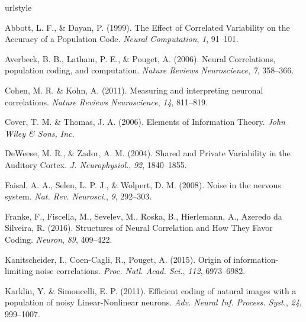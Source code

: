 \documentclass[12pt]{article}
\begin{document}
\newpage
\begin{thebibliography}{100}
\providecommand{\natexlab}[1]{#1}
\expandafter\ifx\csname urlstyle\endcsname\relax
  \providecommand{\doi}[1]{doi:\discretionary{}{}{}#1}\else
  \providecommand{\doi}{doi:\discretionary{}{}{}\begingroup
  \urlstyle{rm}\Url}\fi


Abbott, L. F., \& Dayan, P. (1999).
\newblock The Effect of Correlated Variability on the Accuracy of a Population Code.
\newblock \emph{Neural Computation}, \emph{1}, 91--101.

Averbeck, B. B., Latham, P. E., \& Pouget, A. (2006).
\newblock Neural Correlations, population coding, and computation.
\newblock \emph{Nature Reviews Neuroscience}, \emph{7}, 358--366.

Cohen, M. R. \& Kohn, A. (2011).
\newblock Measuring and interpreting neuronal correlations.
\newblock \emph{Nature Reviews Neuroscience}, \emph{14}, 811--819.

Cover, T. M. \& Thomas, J. A. (2006).
\newblock Elements of Information Theory.
\newblock \emph{John Wiley \& Sons, Inc.}

DeWeese, M. R., \& Zador, A. M. (2004).
\newblock Shared and Private Variability in the Auditory Cortex.
\newblock \emph{J. Neurophysiol.}, \emph{92}, 1840--1855.

Faisal, A. A., Selen, L. P. J., \& Wolpert, D. M. (2008).
\newblock Noise in the nervous system.
\newblock \emph{Nat. Rev. Neurosci.}, \emph{9}, 292--303.

Franke, F., Fiscella, M., Sevelev, M., Roska, B., Hierlemann, A., Azeredo da Silveira, R. (2016).
\newblock Structures of Neural Correlation and How They Favor Coding.
\newblock \emph{Neuron}, \emph{89}, 409--422.

Kanitscheider, I., Coen-Cagli, R., Pouget, A. (2015).
\newblock Origin of information-limiting noise correlations.
\newblock \emph{Proc. Natl. Acad. Sci.}, \emph{112}, 6973--6982.

Karklin, Y. \& Simoncelli, E. P. (2011).
\newblock Efficient coding of natural images with a population of noisy
Linear-Nonlinear neurons.
\newblock \emph{Adv. Neural Inf. Process. Syst.}, \emph{24}, 999--1007.


\end{thebibliography}
\end{document}
